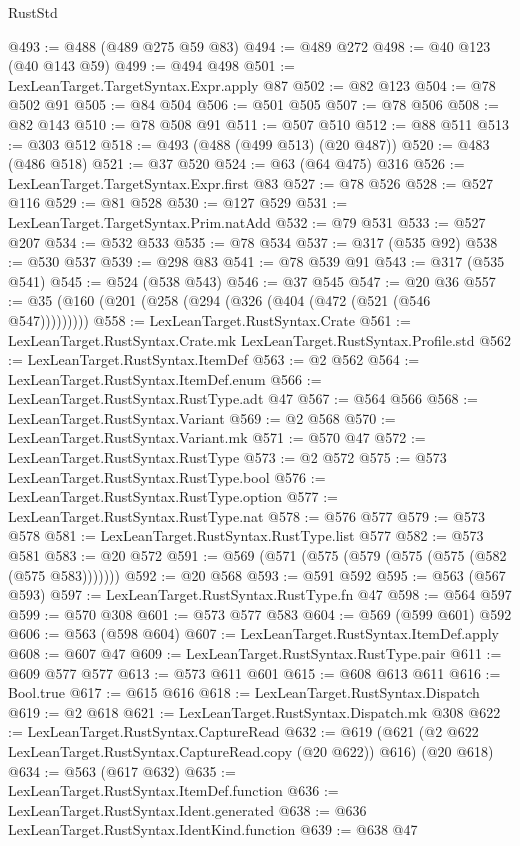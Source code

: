 \begin{lexlean}{RustStd}
\begin{coremodule}
@493 := @488 (@489 @275 @59 @83)
@494 := @489 @272
@498 := @40 @123 (@40 @143 @59)
@499 := @494 @498
@501 := LexLeanTarget.TargetSyntax.Expr.apply @87
@502 := @82 @123
@504 := @78 @502 @91
@505 := @84 @504
@506 := @501 @505
@507 := @78 @506
@508 := @82 @143
@510 := @78 @508 @91
@511 := @507 @510
@512 := @88 @511
@513 := @303 @512
@518 := @493 (@488 (@499 @513) (@20 @487))
@520 := @483 (@486 @518)
@521 := @37 @520
@524 := @63 (@64 @475) @316
@526 := LexLeanTarget.TargetSyntax.Expr.first @83
@527 := @78 @526
@528 := @527 @116
@529 := @81 @528
@530 := @127 @529
@531 := LexLeanTarget.TargetSyntax.Prim.natAdd
@532 := @79 @531
@533 := @527 @207
@534 := @532 @533
@535 := @78 @534
@537 := @317 (@535 @92)
@538 := @530 @537
@539 := @298 @83
@541 := @78 @539 @91
@543 := @317 (@535 @541)
@545 := @524 (@538 @543)
@546 := @37 @545
@547 := @20 @36
@557 := @35 (@160 (@201 (@258 (@294 (@326 (@404 (@472 (@521 (@546 @547)))))))))
@558 := LexLeanTarget.RustSyntax.Crate
@561 := LexLeanTarget.RustSyntax.Crate.mk LexLeanTarget.RustSyntax.Profile.std
@562 := LexLeanTarget.RustSyntax.ItemDef
@563 := @2 @562
@564 := LexLeanTarget.RustSyntax.ItemDef.enum
@566 := LexLeanTarget.RustSyntax.RustType.adt @47
@567 := @564 @566
@568 := LexLeanTarget.RustSyntax.Variant
@569 := @2 @568
@570 := LexLeanTarget.RustSyntax.Variant.mk
@571 := @570 @47
@572 := LexLeanTarget.RustSyntax.RustType
@573 := @2 @572
@575 := @573 LexLeanTarget.RustSyntax.RustType.bool
@576 := LexLeanTarget.RustSyntax.RustType.option
@577 := LexLeanTarget.RustSyntax.RustType.nat
@578 := @576 @577
@579 := @573 @578
@581 := LexLeanTarget.RustSyntax.RustType.list @577
@582 := @573 @581
@583 := @20 @572
@591 := @569 (@571 (@575 (@579 (@575 (@575 (@582 (@575 @583)))))))
@592 := @20 @568
@593 := @591 @592
@595 := @563 (@567 @593)
@597 := LexLeanTarget.RustSyntax.RustType.fn @47
@598 := @564 @597
@599 := @570 @308
@601 := @573 @577 @583
@604 := @569 (@599 @601) @592
@606 := @563 (@598 @604)
@607 := LexLeanTarget.RustSyntax.ItemDef.apply
@608 := @607 @47
@609 := LexLeanTarget.RustSyntax.RustType.pair
@611 := @609 @577 @577
@613 := @573 @611 @601
@615 := @608 @613 @611
@616 := Bool.true
@617 := @615 @616
@618 := LexLeanTarget.RustSyntax.Dispatch
@619 := @2 @618
@621 := LexLeanTarget.RustSyntax.Dispatch.mk @308
@622 := LexLeanTarget.RustSyntax.CaptureRead
@632 := @619 (@621 (@2 @622 LexLeanTarget.RustSyntax.CaptureRead.copy (@20 @622)) @616) (@20 @618)
@634 := @563 (@617 @632)
@635 := LexLeanTarget.RustSyntax.ItemDef.function
@636 := LexLeanTarget.RustSyntax.Ident.generated
@638 := @636 LexLeanTarget.RustSyntax.IdentKind.function
@639 := @638 @47

\end{coremodule}
\end{lexlean}
